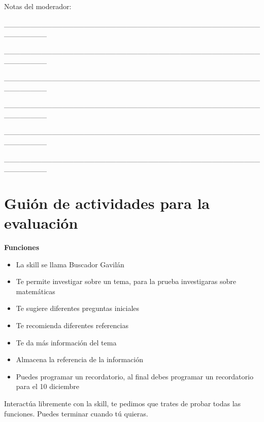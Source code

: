 \begin{tcolorbox}[colback=white!25!white,colframe=blue]
  Notas del moderador:

  \_\_\_\_\_\_\_\_\_\_\_\_\_\_\_\_\_\_\_\_\_\_\_\_\_\_\_\_\_\_\_\_\_\_\_\_\_\_\_\_\_\_\_\_\_\_\_\_\_\_\_\_\_\_\_\_

  \_\_\_\_\_\_\_\_\_\_\_\_\_\_\_\_\_\_\_\_\_\_\_\_\_\_\_\_\_\_\_\_\_\_\_\_\_\_\_\_\_\_\_\_\_\_\_\_\_\_\_\_\_\_\_\_

  \_\_\_\_\_\_\_\_\_\_\_\_\_\_\_\_\_\_\_\_\_\_\_\_\_\_\_\_\_\_\_\_\_\_\_\_\_\_\_\_\_\_\_\_\_\_\_\_\_\_\_\_\_\_\_\_

  \_\_\_\_\_\_\_\_\_\_\_\_\_\_\_\_\_\_\_\_\_\_\_\_\_\_\_\_\_\_\_\_\_\_\_\_\_\_\_\_\_\_\_\_\_\_\_\_\_\_\_\_\_\_\_\_

  \_\_\_\_\_\_\_\_\_\_\_\_\_\_\_\_\_\_\_\_\_\_\_\_\_\_\_\_\_\_\_\_\_\_\_\_\_\_\_\_\_\_\_\_\_\_\_\_\_\_\_\_\_\_\_\_

  \_\_\_\_\_\_\_\_\_\_\_\_\_\_\_\_\_\_\_\_\_\_\_\_\_\_\_\_\_\_\_\_\_\_\_\_\_\_\_\_\_\_\_\_\_\_\_\_\_\_\_\_\_\_\_\_

\end{tcolorbox}


\section{Guión de actividades para la evaluación}
\label{B4Anexo}

\begin{tcolorbox}[colback=white!25!white,colframe=blue]
  \textbf{Funciones}
  \begin{itemize}
    \item La skill se llama Buscador Gavilán
    \item Te permite investigar sobre un tema, para la prueba investigaras sobre matemáticas
    \item Te sugiere diferentes preguntas iniciales
    \item Te recomienda diferentes referencias
    \item Te da más información del tema
    \item Almacena la referencia de la información
    \item Puedes programar un recordatorio, al final debes programar un recordatorio para el 10 diciembre
  \end{itemize}

  Interactúa libremente con la skill, te pedimos que trates de probar todas las funciones.
  Puedes terminar cuando tú quieras.

\end{tcolorbox}

